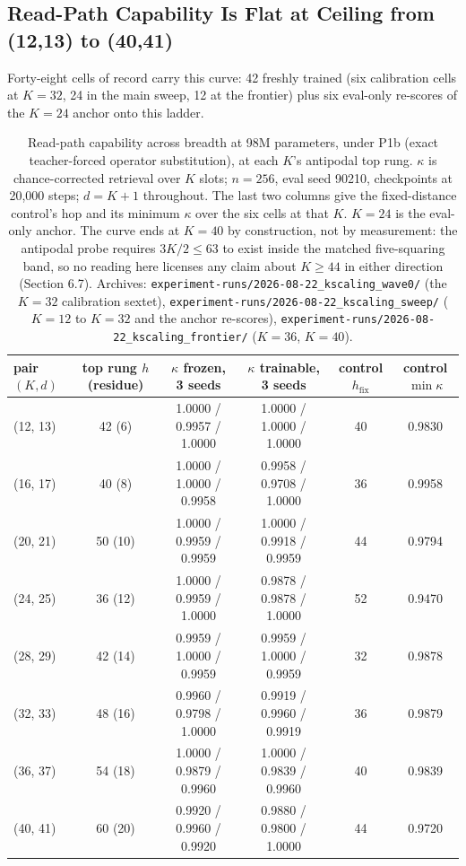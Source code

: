 \subsection{Read-Path Capability Is Flat at Ceiling from (12,13) to (40,41)}

Forty-eight cells of record carry this curve: 42 freshly trained (six
calibration cells at $K{=}32$, 24 in the main sweep, 12 at the frontier)
plus six eval-only re-scores of the $K{=}24$ anchor onto this ladder.

\begin{table}[t]
\centering
\caption{Read-path capability across breadth at 98M parameters, under P1b (exact teacher-forced operator substitution), at each $K$'s antipodal top rung. $\kappa$ is chance-corrected retrieval over $K$ slots; $n{=}256$, eval seed 90210, checkpoints at 20,000 steps; $d = K{+}1$ throughout. The last two columns give the fixed-distance control's hop and its minimum $\kappa$ over the six cells at that $K$. $K{=}24$ is the eval-only anchor. The curve ends at $K{=}40$ by construction, not by measurement: the antipodal probe requires $3K/2 \leq 63$ to exist inside the matched five-squaring band, so no reading here licenses any claim about $K \geq 44$ in either direction (Section 6.7). Archives: \texttt{experiment-runs/2026-08-22\_kscaling\_wave0/} (the $K{=}32$ calibration sextet), \texttt{experiment-runs/2026-08-22\_kscaling\_sweep/} ($K{=}12$ to $K{=}32$ and the anchor re-scores), \texttt{experiment-runs/2026-08-22\_kscaling\_frontier/} ($K{=}36$, $K{=}40$).}
\label{tab:breadth-capability}
\small
\begin{tabular}{lccccc}
\toprule
pair $(K, d)$ & top rung $h$ (residue) & $\kappa$ frozen, 3 seeds & $\kappa$ trainable, 3 seeds & control $h_{\mathrm{fix}}$ & control $\min \kappa$ \\
\midrule
(12, 13) & 42 (6) & 1.0000 / 0.9957 / 1.0000 & 1.0000 / 1.0000 / 1.0000 & 40 & 0.9830 \\
(16, 17) & 40 (8) & 1.0000 / 1.0000 / 0.9958 & 0.9958 / 0.9708 / 1.0000 & 36 & 0.9958 \\
(20, 21) & 50 (10) & 1.0000 / 0.9959 / 0.9959 & 1.0000 / 0.9918 / 0.9959 & 44 & 0.9794 \\
(24, 25) & 36 (12) & 1.0000 / 0.9959 / 1.0000 & 0.9878 / 0.9878 / 1.0000 & 52 & 0.9470 \\
(28, 29) & 42 (14) & 0.9959 / 1.0000 / 0.9959 & 0.9959 / 1.0000 / 0.9959 & 32 & 0.9878 \\
(32, 33) & 48 (16) & 0.9960 / 0.9798 / 1.0000 & 0.9919 / 0.9960 / 0.9919 & 36 & 0.9879 \\
(36, 37) & 54 (18) & 1.0000 / 0.9879 / 0.9960 & 1.0000 / 0.9839 / 0.9960 & 40 & 0.9839 \\
(40, 41) & 60 (20) & 0.9920 / 0.9960 / 0.9920 & 0.9880 / 0.9800 / 1.0000 & 44 & 0.9720 \\
\bottomrule
\end{tabular}
\end{table}

